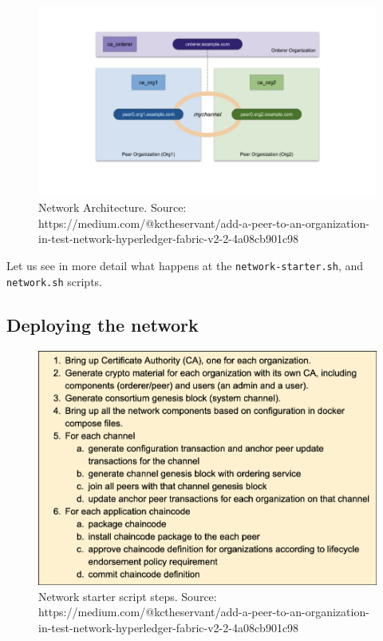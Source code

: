 \documentclass[12pt,a4paper]{article}
\theoremstyle{definition}
\begin{document}
\begin{figure}[h]
    \centering
    \includegraphics[scale=0.6]{figures/network.png}
    \caption{Network Architecture. Source: https://medium.com/@kctheservant/add-a-peer-to-an-organization-in-test-network-hyperledger-fabric-v2-2-4a08cb901c98}
    \label{fig:architecture}
\end{figure}

Let us see in more detail what happens at the \texttt{network-starter.sh}, and \texttt{network.sh} scripts.

\subsection{Deploying the network}

\begin{figure}[h]
    \centering
    \includegraphics[scale=0.4]{figures/steps.png}
    \caption{Network starter script steps. Source: https://medium.com/@kctheservant/add-a-peer-to-an-organization-in-test-network-hyperledger-fabric-v2-2-4a08cb901c98}
    \label{fig:steps}
\end{figure}
\end{document}
